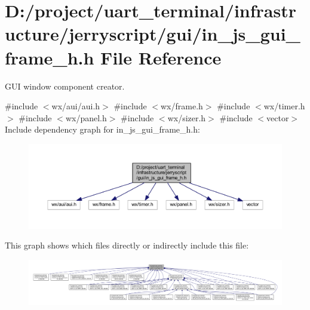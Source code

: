 \section{D\+:/project/uart\+\_\+terminal/infrastructure/jerryscript/gui/in\+\_\+js\+\_\+gui\+\_\+frame\+\_\+h.h File Reference}
\label{in__js__gui__frame__h_8h}


G\+UI window component creator.  


{\ttfamily \#include $<$wx/aui/aui.\+h$>$}\newline
{\ttfamily \#include $<$wx/frame.\+h$>$}\newline
{\ttfamily \#include $<$wx/timer.\+h$>$}\newline
{\ttfamily \#include $<$wx/panel.\+h$>$}\newline
{\ttfamily \#include $<$wx/sizer.\+h$>$}\newline
{\ttfamily \#include $<$vector$>$}\newline
Include dependency graph for in\+\_\+js\+\_\+gui\+\_\+frame\+\_\+h.\+h\+:
\nopagebreak
\begin{figure}[H]
\begin{center}
\leavevmode
\includegraphics[width=350pt]{in__js__gui__frame__h_8h__incl}
\end{center}
\end{figure}
This graph shows which files directly or indirectly include this file\+:
\nopagebreak
\begin{figure}[H]
\begin{center}
\leavevmode
\includegraphics[width=350pt]{in__js__gui__frame__h_8h__dep__incl}
\end{center}
\end{figure}
